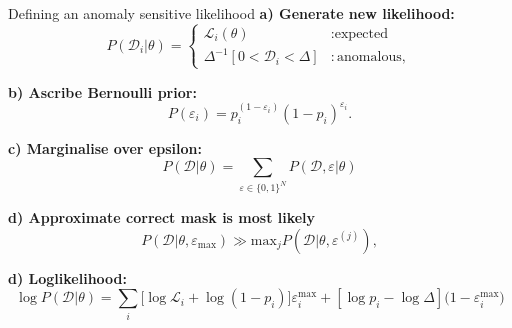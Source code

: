 \documentclass{beamer}
\begin{document}
  \begin{frame}{Defining an anomaly sensitive likelihood}
    \footnotesize
    \textbf{a) Generate new likelihood:}
    \begin{equation}
        P(\mathcal{D}_i|\theta) = \begin{cases}
            \mathcal{L}_i(\theta) &: \text{expected}\\
            \Delta^{-1}[ 0<\mathcal{D}_i<\Delta] &: \text{anomalous},
        \end{cases}
    \end{equation}

    \textbf{b) Ascribe Bernoulli prior:}
    \begin{equation}
        P(\varepsilon_i) = p_i^{(1-\varepsilon_i)}(1-p_i)^{\varepsilon_i}.
    \end{equation}

    \textbf{c) Marginalise over epsilon:}
    \begin{equation}
        P(\mathcal{D} | \theta) =\sum_{\varepsilon \in \{ 0, 1 \} ^N}P(\mathcal{D},\varepsilon|\theta)
      \end{equation}


      \textbf{d) Approximate correct mask is most likely}
       \begin{equation}
 P(\mathcal{D}|\theta, \varepsilon_{\mathrm{max}}) \gg \mathrm{max}_j P(\mathcal{D}|\theta,\varepsilon^{(j)})\label{eq:nlo},
\end{equation}

    \textbf{d) Loglikelihood:}
    \begin{equation}
        \log{P(\mathcal{D}|\theta)} = \sum_{i}[{\log{\mathcal{L}_i}+\log({1-p_i})]\varepsilon^{\mathrm{max}}_i + [\log{p}_i - \log{\Delta}](1 - \varepsilon^\mathrm{max}_i})
    \end{equation}
  \end{frame}
\end{document}
